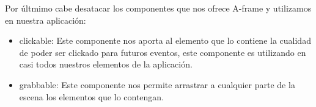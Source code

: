 \documentclass[a4paper, 12pt]{book}
\begin{document}
Por últmimo cabe desatacar los componentes que nos ofrece A-frame y utilizamos en nuestra aplicación:
\begin{itemize}
    \item clickable: Este componente nos aporta al elemento que lo contiene la cualidad de poder ser clickado para futuros eventos, este componente es utilizando en casi todos nuestros elementos de la aplicación.
    \item grabbable: Este componente nos permite arrastrar a cualquier parte de la escena los elementos que lo contengan. 
\end{itemize}
\end{document}
